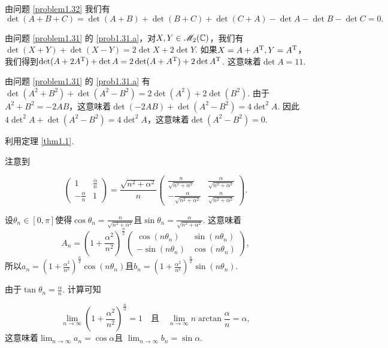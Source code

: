 \begin{solution}
  由问题 \ref{problem1.32} 我们有
  \[
    \det (A+B+C) = \det(A+B) + \det(B+C) + \det(C+A)
    - \det A - \det B - \det C = 0.
  \]
\end{solution}

\begin{solution}
  由问题 \ref{problem1.31} 的 \ref{prob1.31.a}，对$X,Y\in\mathscr M_2(\mathbb C)$，我们有$\det(X+Y)+\det(X-Y)=2\det X+2\det Y$. 如果$X=A+A^{\mathrm T},Y=A^{\mathrm T}$，我们得到$\det(A+2A^{\mathrm T})+\det A=2\det(A+A^{\mathrm T})+2\det A^{\mathrm T}$. 这意味着$\det A=11$.
\end{solution}

\begin{solution}
  由问题 \ref{problem1.31} 的 \ref{prob1.31.a} 有$\det(A^2+B^2)+\det(A^2-B^2)=2\det(A^2)+2\det(B^2)$. 由于$A^2+B^2=-2AB$，这意味着$\det(-2AB)+\det(A^2-B^2)=4\det\nolimits^2A$. 因此$4\det\nolimits^2A+\det(A^2-B^2)=4\det\nolimits^2A$，这意味着$\det(A^2-B^2)=0$.
\end{solution}

\begin{solution}
  利用定理 \ref{thm1.1}.
\end{solution}

\begin{solution}
  \begin{enuma}
    \item 注意到
  \end{enuma}
  \[
    \begin{pmatrix}
      1 & \frac\alpha n\\
      -\frac\alpha n & 1
    \end{pmatrix} = \frac{\sqrt{n^2+\alpha^2}}n
    \begin{pmatrix}
      \frac n {\sqrt{n^2+\alpha^2}} & \frac \alpha {\sqrt{n^2+\alpha^2}} \\
      -\frac \alpha {\sqrt{n^2+\alpha^2}}
      &  \frac n {\sqrt{n^2+\alpha^2}}
    \end{pmatrix}.
  \]

  设$\theta_n\in[0,\pi]$使得$\cos\theta_n= \frac n {\sqrt{n^2+\alpha^2}}$且$\sin\theta_n= \frac \alpha {\sqrt{n^2+\alpha^2}}$. 这意味着
  \[
    A_n = \left( 1+\frac{\alpha^2}{n^2} \right)^{\frac n2}
    \begin{pmatrix}
      \cos(n\theta_n) & \sin(n\theta_n) \\
      -\sin(n\theta_n) & \cos(n\theta_n)
    \end{pmatrix},
  \]
  所以$a_n=\left( 1+\frac{\alpha^2}{n^2} \right)^{\frac n2}\cos(n\theta_n)$且$b_n=\left( 1+\frac{\alpha^2}{n^2} \right)^{\frac n2}\sin(n\theta_n)$.

  \begin{enuma}\setcounter{enumi}{1}
    \item 由于$\tan\theta_n=\frac\alpha n$. 计算可知
  \end{enuma}
  \[
      \lim_{n\to\infty}\left( 1 + \frac{\alpha^2}{n^2} \right)^{\frac n2} = 1 \quad \text{且}\quad \lim_{n\to\infty}n\arctan\frac\alpha n = \alpha,
    \]
    这意味着$\lim_{n\to\infty}a_n=\cos\alpha$且
    $\lim_{n\to\infty}b_n=\sin\alpha$.
\end{solution}

